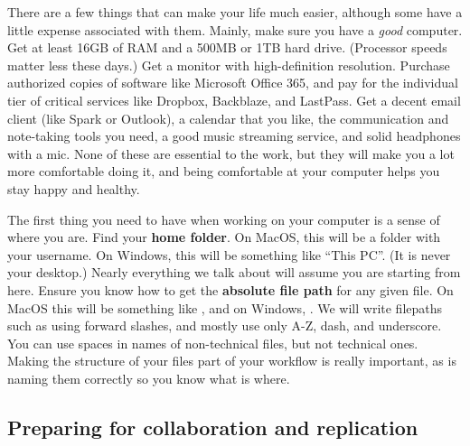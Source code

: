 There are a few things that can make your life much easier,
although some have a little expense associated with them.
Mainly, make sure you have a \textit{good} computer.
Get at least 16GB of RAM and a 500MB or 1TB hard drive.
(Processor speeds matter less these days.)
Get a monitor with high-definition resolution.
Purchase authorized copies of software like Microsoft Office 365,
and pay for the individual tier of critical services like Dropbox, Backblaze, and LastPass.
Get a decent email client (like Spark or Outlook),
a calendar that you like, the communication and note-taking tools you need,
a good music streaming service, and solid headphones with a mic.
None of these are essential to the work,
but they will make you a lot more comfortable doing it,
and being comfortable at your computer helps you stay happy and healthy.

The first thing you need to have when working on your computer is a sense of where you are.
Find your \textbf{home folder}. On MacOS, this will be a folder with your username.
On Windows, this will be something like ``This PC''. (It is never your desktop.)
Nearly everything we talk about will assume you are starting from here.
Ensure you know how to get the \textbf{absolute file path} for any given file.
On MacOS this will be something like ,
and on Windows, .
We will write filepaths such as 
using forward slashes, and mostly use only A-Z, dash, and underscore.
You can use spaces in names of non-technical files, but not technical ones.
Making the structure of your files part of your workflow is really important,
as is naming them correctly so you know what is where.

\subsection{Preparing for collaboration and replication}

